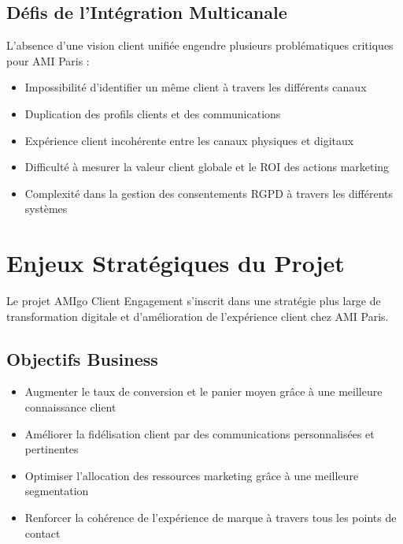 \subsection{Défis de l'Intégration Multicanale}
\begin{mdframed}[backgroundcolor=lightgreen!20, linewidth=1pt]
L'absence d'une vision client unifiée engendre plusieurs problématiques critiques pour AMI Paris :
\begin{itemize}
    \item Impossibilité d'identifier un même client à travers les différents canaux
    \item Duplication des profils clients et des communications
    \item Expérience client incohérente entre les canaux physiques et digitaux
    \item Difficulté à mesurer la valeur client globale et le ROI des actions marketing
    \item Complexité dans la gestion des consentements RGPD à travers les différents systèmes
\end{itemize}
\end{mdframed}

\section{Enjeux Stratégiques du Projet}
Le projet AMIgo Client Engagement s'inscrit dans une stratégie plus large de transformation digitale et d'amélioration de l'expérience client chez AMI Paris.

\subsection{Objectifs Business}
\begin{itemize}
    \item Augmenter le taux de conversion et le panier moyen grâce à une meilleure connaissance client
    \item Améliorer la fidélisation client par des communications personnalisées et pertinentes
    \item Optimiser l'allocation des ressources marketing grâce à une meilleure segmentation
    \item Renforcer la cohérence de l'expérience de marque à travers tous les points de contact
\end{itemize}

